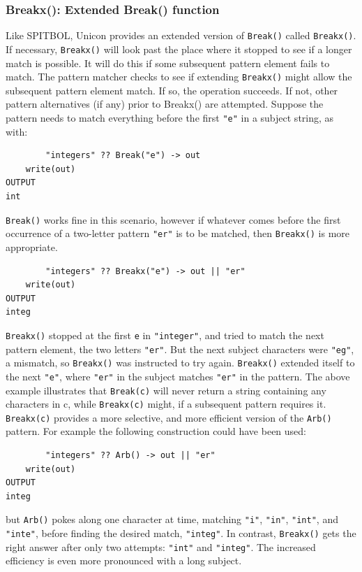\documentclass[letterpaper,12pt]{article}
\begin{document}
\subsubsection{Breakx(): Extended Break() function}

Like SPITBOL, Unicon provides an extended version of \texttt{Break()} called
\texttt{Breakx()}. If necessary, {\tt Breakx()} will look past the
place where it
stopped to see if a longer match is possible. It will do this if some
subsequent pattern element fails to match. The pattern matcher checks
to see if extending {\tt Breakx()} might allow the subsequent pattern
element match. If so, the operation succeeds. If not, other pattern
alternatives (if any) prior to Breakx() are attempted.  Suppose the
pattern needs to match everything before the first \texttt{"e"} in a
subject string, as with:

\begin{verbatim}
        "integers" ?? Break("e") -> out
	write(out)
OUTPUT
int
\end{verbatim}

{\tt Break()} works fine in this scenario, however if whatever comes before
the first occurrence of a two-letter pattern {\tt "er"} is to be matched,
then {\tt Breakx()} is more appropriate.

\begin{verbatim}
        "integers" ?? Breakx("e") -> out || "er"
	write(out)
OUTPUT
integ
\end{verbatim}

{\tt Breakx()} stopped at the first {\tt e} in {\tt "integer"},
and tried to match
the next pattern element, the two letters {\tt "er"}. But the next subject
characters were {\tt "eg"}, a mismatch, so {\tt Breakx()} was instructed to try
again. {\tt Breakx()} extended itself to the next {\tt "e"}, where
{\tt "er"} in the
subject matches {\tt "er"} in the pattern.  The above example illustrates
that {\tt Break(c)} will never return a string containing any characters in
c, while {\tt Breakx(c)} might, if a subsequent pattern requires it.
{\tt Breakx(c)} provides a more selective, and more efficient version of
the {\tt Arb()} pattern. For example the following construction could have
been used:

\begin{verbatim}
        "integers" ?? Arb() -> out || "er"
	write(out)
OUTPUT
integ
\end{verbatim}

\noindent
but {\tt Arb()} pokes along one character at time, matching
{\tt "i"}, {\tt "in"},
{\tt "int"}, and {\tt "inte"}, before finding the desired match,
{\tt "integ"}. In
contrast, {\tt Breakx()} gets the right answer after only two attempts:
{\tt "int"} and {\tt "integ"}. The increased efficiency is even more pronounced
with a long subject.
\end{document}
